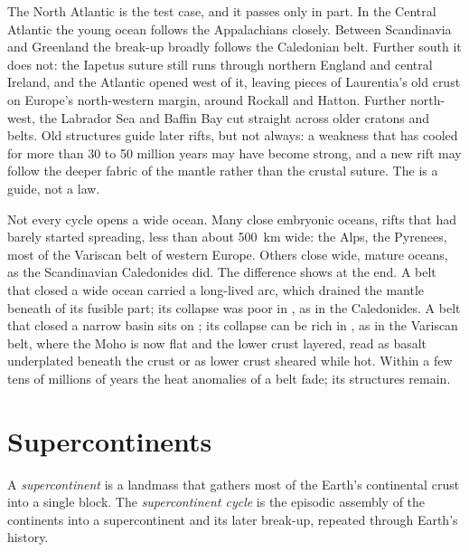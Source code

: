 The North Atlantic is the test case, and it passes only in part. In the Central Atlantic the
young ocean follows the Appalachians closely. Between Scandinavia and Greenland the break-up
broadly follows the Caledonian belt. Further south it does not: the Iapetus suture still runs
through northern England and central Ireland, and the Atlantic opened west of it, leaving
pieces of Laurentia's old crust on Europe's north-western margin, around Rockall and Hatton.
Further north-west, the Labrador Sea and Baffin Bay cut straight across older cratons and
belts. Old structures guide later rifts, but not always: a weakness that has cooled for more
than 30 to 50 million years may have become strong, and a new rift may follow the deeper
fabric of the mantle rather than the crustal suture. The  is a guide, not a law.

Not every cycle opens a wide ocean. Many  close embryonic oceans, rifts that had barely
started spreading, less than about \qty{500}{km} wide: the Alps, the Pyrenees, most of the
Variscan belt of western Europe. Others close wide, mature oceans, as the Scandinavian
Caledonides did. The difference shows at the end. A belt that closed a wide ocean carried a
long-lived arc, which drained the mantle beneath of its fusible part; its collapse was poor in
, as in the Caledonides. A belt that closed a narrow basin sits on ; its
collapse can be rich in , as in the Variscan belt, where the Moho is now flat and the
lower crust layered, read as basalt underplated beneath the crust or as lower crust sheared
while hot. Within a few tens of millions of years the heat
anomalies of a belt fade; its structures remain.

\section{Supercontinents}\label{sec:b2:wilson-cycle:supercontinents}

\begin{definition}\label{def:b2:wilson-cycle:supercontinent}
A \emph{supercontinent} is a landmass that gathers most of the Earth's
continental crust into a single block. The \emph{supercontinent cycle} is the episodic assembly of the continents into a supercontinent and its later
break-up, repeated through Earth's history.
\end{definition}

